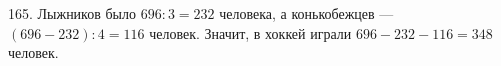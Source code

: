 165. Лыжников было $696:3=232$ человека, а конькобежцев --- $(696-232):4=116$ человек. Значит, в хоккей играли $696-232-116=348$ человек.\\
